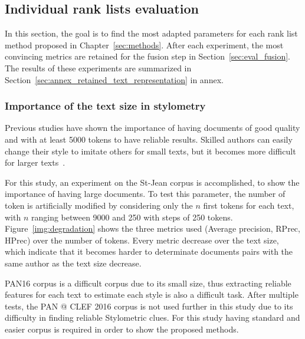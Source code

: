\subsection{Individual rank lists evaluation \label{sec:eval_rl}}

In this section, the goal is to find the most adapted parameters for each rank list method proposed in Chapter~\ref{sec:methods}.
After each experiment, the most convincing metrics are retained for the fusion step in Section~\ref{sec:eval_fusion}.
The results of these experiments are summarized in Section~\ref{sec:annex_retained_text_representation} in annex.

\subsubsection{Importance of the text size in stylometry}

Previous studies have shown the importance of having documents of good quality and with at least 5000 tokens to have reliable results.
Skilled authors can easily change their style to imitate others for small texts, but it becomes more difficult for larger texts~\cite{savoy_stylo}.

For this study, an experiment on the St-Jean corpus is accomplished, to show the importance of having large documents.
To test this parameter, the number of token is artificially modified by considering only the $n$ first tokens for each text, with $n$ ranging between 9000 and 250 with steps of 250 tokens.
Figure~\ref{img:degradation} shows the three metrics used (Average precision, RPrec, HPrec) over the number of tokens.
Every metric decrease over the text size, which indicate that it becomes harder to determinate documents pairs with the same author as the text size decrease.

PAN16 corpus is a difficult corpus due to its small size, thus extracting reliable features for each text to estimate each style is also a difficult task.
After multiple tests, the PAN @ CLEF 2016 corpus is not used further in this study due to its difficulty in finding reliable Stylometric clues.
For this study having standard and easier corpus is required in order to show the proposed methods.

